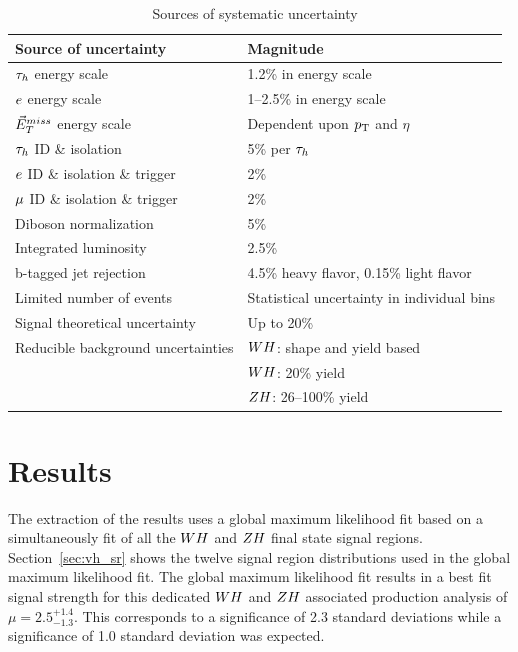 \begin{table}[!ht]
\centering
{}
\begin{tabular}{ll}
Source of uncertainty & Magnitude \\
\hline
 $\tau_{h}$ energy scale                & 1.2\% in energy scale\\
 $e$ energy scale               & 1--2.5\%  in energy scale \\
 $\vec{E}^{miss}_T$ energy scale              & Dependent upon $p_\mathrm{T}$ and $\eta$ \\
 $\tau_{h}$ ID \& isolation & 5\% per $\tau_{h}$  \\
 $e$ ID \& isolation \& trigger  &   2\%  \\
 $\mu$ ID \& isolation \& trigger & 2\%  \\
 Diboson normalization & 5\% \\
 Integrated luminosity     & 2.5\%  \\
 b-tagged jet rejection & 4.5\% heavy flavor, 0.15\% light flavor \\
 Limited number of events                & Statistical uncertainty in individual bins  \\
 Signal theoretical uncertainty  & Up to 20\% \\
 Reducible background uncertainties & $WH$: shape and yield based \\
                                    & $WH$: 20\% yield \\
                                    & $ZH$: 26--100\% yield \\
\hline
\end{tabular}
\caption{Sources of systematic uncertainty}
\label{tab:vh_uncertainties}
\end{table}



\section{Results}
\label{sec:vh_results}

The extraction of the results uses a global maximum likelihood fit based on a 
simultaneously fit of all the $WH$ and $ZH$ final state signal regions. 
Section~\ref{sec:vh_sr} shows the twelve signal region distributions
used in the global maximum likelihood fit. 
The global maximum likelihood fit results in a best fit signal
strength for this dedicated $WH$ and $ZH$ associated production analysis of
$\mu = 2.5 ^{+1.4} _{-1.3}$. This corresponds to 
a significance of 2.3 standard deviations while a significance of 1.0 standard deviation was expected.

